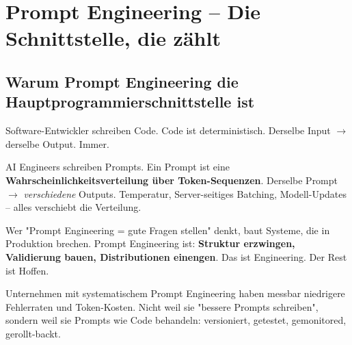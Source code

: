 \chapter{Prompt Engineering -- Die Schnittstelle, die zählt}
\label{chap:prompt_engineering}


\section{Warum Prompt Engineering die Hauptprogrammierschnittstelle ist}

Software-Entwickler schreiben Code. Code ist deterministisch. Derselbe Input $\rightarrow$ derselbe Output. Immer.

AI Engineers schreiben Prompts. Ein Prompt ist eine \textbf{Wahrscheinlichkeitsverteilung über Token-Sequenzen}. Derselbe Prompt $\rightarrow$ \textit{verschiedene} Outputs. Temperatur, Server-seitiges Batching, Modell-Updates -- alles verschiebt die Verteilung.

\par



\par\mbox{}\par
\begin{realitycheckEnv}
Wer "Prompt Engineering = gute Fragen stellen" denkt, baut Systeme, die in Produktion brechen. Prompt Engineering ist: \textbf{Struktur erzwingen, Validierung bauen, Distributionen einengen}. Das ist Engineering. Der Rest ist Hoffen.
\end{realitycheckEnv}

Unternehmen mit systematischem Prompt Engineering haben messbar niedrigere Fehlerraten und Token-Kosten. Nicht weil sie "bessere Prompts schreiben", sondern weil sie Prompts wie Code behandeln: versioniert, getestet, gemonitored, gerollt-backt.

